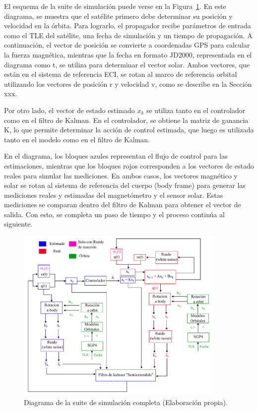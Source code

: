 El esquema de la suite de simulación puede verse en la Figura~\ref{fig:suite}. En este diagrama, se muestra que el satélite primero debe determinar su posición y velocidad en la órbita. Para lograrlo, el propagador recibe parámetros de entrada como el TLE del satélite, una fecha de simulación y un tiempo de propagación. A continuación, el vector de posición se convierte a coordenadas \gls{GPS} para calcular la fuerza magnética, mientras que la fecha en formato JD2000, representada en el diagrama como t, se utiliza para determinar el vector solar. Ambos vectores, que están en el sistema de referencia ECI, se rotan al marco de referencia orbital utilizando los vectores de posición r y velocidad v, como se describe en la Sección xxx.

Por otro lado, el vector de estado estimado $x_{k}$ se utiliza tanto en el controlador como en el filtro de Kalman. En el controlador, se obtiene la matriz de ganancia K, lo que permite determinar la acción de control estimada, que luego es utilizada tanto en el modelo como en el filtro de Kalman.

En el diagrama, los bloques azules representan el flujo de control para las estimaciones, mientras que los bloques rojos corresponden a los vectores de estado reales para simular las mediciones. En ambos casos, los vectores magnético y solar se rotan al sistema de referencia del cuerpo (body frame) para generar las mediciones reales y estimadas del magnetómetro y el sensor solar. Estas mediciones se comparan dentro del filtro de Kalman para obtener el vector de salida. Con esto, se completa un paso de tiempo y el proceso continúa al siguiente.

\begin{figure}[H]
	\centering    
	\includegraphics[width=0.9\textwidth]{suite.pdf}
	\caption{Diagrama de la suite de simulación completa (Elaboración propia).}
	\label{fig:suite}
\end{figure}